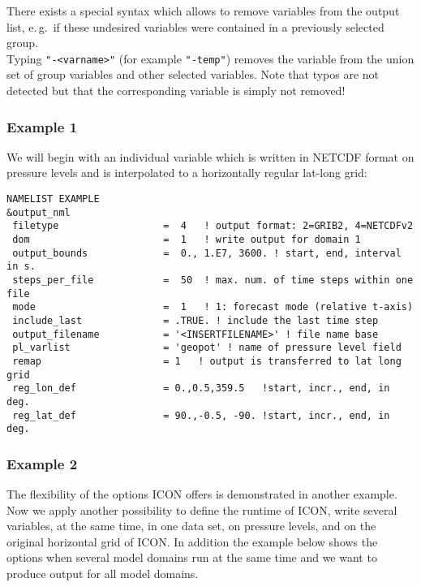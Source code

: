       There exists a special syntax which allows to remove variables from the output list, e.\,g.\ if
      these undesired variables were contained in a previously selected group.\\
      Typing \texttt{"-\textnormal{<varname>}"} (for example \texttt{"-temp"}) removes the
      variable from the union set of group variables and other selected variables.
      Note that typos are not detected but that the corresponding variable is
      simply not removed!



\subsubsection{Example 1}

We will begin with an individual variable which is written in NETCDF format on pressure levels and is interpolated to a horizontally regular lat-long grid:

\begin{Verbatim}[frame=single]
NAMELIST EXAMPLE
&output_nml
 filetype                  =  4   ! output format: 2=GRIB2, 4=NETCDFv2
 dom                       =  1   ! write output for domain 1
 output_bounds             =  0., 1.E7, 3600. ! start, end, interval in s.
 steps_per_file            =  50  ! max. num. of time steps within one file
 mode                      =  1   ! 1: forecast mode (relative t-axis)
 include_last              = .TRUE. ! include the last time step
 output_filename           = '<INSERTFILENAME>' ! file name base
 pl_varlist                = 'geopot' ! name of pressure level field
 remap                     = 1   ! output is transferred to lat long grid
 reg_lon_def               = 0.,0.5,359.5   !start, incr., end, in deg.
 reg_lat_def               = 90.,-0.5, -90. !start, incr., end, in deg.
\end{Verbatim}



\subsubsection{Example 2}

The flexibility of the options ICON offers is demonstrated in another example. Now we apply another possibility to define the runtime of ICON, write several variables, at the same time, in one data set, on pressure levels, and on the original horizontal grid of ICON. In addition the example below shows the options when several model domains run at the same time and we want to produce output for all model domains.

